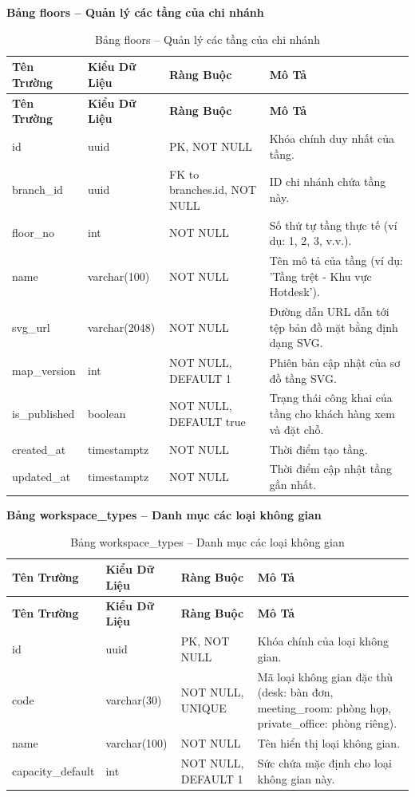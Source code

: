 \textbf{Bảng floors -- Quản lý các tầng của chi nhánh}
\label{table:floors}
\begin{longtable}{|p{3cm}|p{2.5cm}|p{3.5cm}|p{5cm}|}
\caption{Bảng floors -- Quản lý các tầng của chi nhánh} \\
\hline
\textbf{Tên Trường} & \textbf{Kiểu Dữ Liệu} & \textbf{Ràng Buộc} & \textbf{Mô Tả} \\
\hline
\endfirsthead
\hline
\textbf{Tên Trường} & \textbf{Kiểu Dữ Liệu} & \textbf{Ràng Buộc} & \textbf{Mô Tả} \\
\hline
\endhead
id & uuid & PK, NOT NULL & Khóa chính duy nhất của tầng. \\
\hline
branch\_id & uuid & FK to branches.id, NOT NULL & ID chi nhánh chứa tầng này. \\
\hline
floor\_no & int & NOT NULL & Số thứ tự tầng thực tế (ví dụ: 1, 2, 3, v.v.). \\
\hline
name & varchar(100) & NOT NULL & Tên mô tả của tầng (ví dụ: 'Tầng trệt - Khu vực Hotdesk'). \\
\hline
svg\_url & varchar(2048) & NOT NULL & Đường dẫn URL dẫn tới tệp bản đồ mặt bằng định dạng SVG. \\
\hline
map\_version & int & NOT NULL, DEFAULT 1 & Phiên bản cập nhật của sơ đồ tầng SVG. \\
\hline
is\_published & boolean & NOT NULL, DEFAULT true & Trạng thái công khai của tầng cho khách hàng xem và đặt chỗ. \\
\hline
created\_at & timestamptz & NOT NULL & Thời điểm tạo tầng. \\
\hline
updated\_at & timestamptz & NOT NULL & Thời điểm cập nhật tầng gần nhất. \\
\hline
\end{longtable}

\textbf{Bảng workspace\_\allowbreak types -- Danh mục các loại không gian}
\label{table:workspace_types}
\begin{longtable}{|p{3cm}|p{2.5cm}|p{3.5cm}|p{5cm}|}
\caption{Bảng workspace\_\allowbreak types -- Danh mục các loại không gian} \\
\hline
\textbf{Tên Trường} & \textbf{Kiểu Dữ Liệu} & \textbf{Ràng Buộc} & \textbf{Mô Tả} \\
\hline
\endfirsthead
\hline
\textbf{Tên Trường} & \textbf{Kiểu Dữ Liệu} & \textbf{Ràng Buộc} & \textbf{Mô Tả} \\
\hline
\endhead
id & uuid & PK, NOT NULL & Khóa chính của loại không gian. \\
\hline
code & varchar(30) & NOT NULL, UNIQUE & Mã loại không gian đặc thù (desk: bàn đơn, meeting\_room: phòng họp, private\_office: phòng riêng). \\
\hline
name & varchar(100) & NOT NULL & Tên hiển thị loại không gian. \\
\hline
capacity\_default & int & NOT NULL, DEFAULT 1 & Sức chứa mặc định cho loại không gian này. \\
\hline
\end{longtable}

